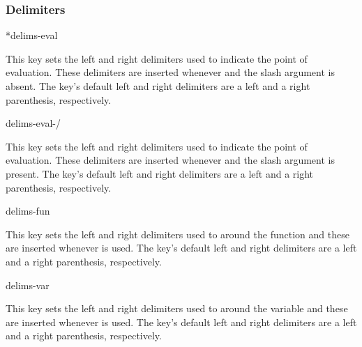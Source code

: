 \documentclass[final,british,10pt]{scrartcl}
\theoremstyle{remark}
\begin{document}
	\subsubsection*{Delimiters}
	
	\begin{option}*{delims-eval}
		\begin{values}[default = (~)]
		\end{values}
		This key sets the left and right delimiters used to indicate the point of evaluation. These delimiters are inserted whenever  and the slash argument is absent. The key's default left and right delimiters are a left and a right parenthesis, respectively.
	\end{option}
	
	\begin{option}{delims-eval-/}
		\begin{values}[default = (~)]
		\end{values}
		This key sets the left and right delimiters used to indicate the point of evaluation. These delimiters are inserted whenever  and the slash argument is present. The key's default left and right delimiters are a left and a right parenthesis, respectively.
	\end{option}
	
	\begin{option}{delims-fun}
		\begin{values}[default = (~)]
		\end{values}
		This key sets the left and right delimiters used to around the function and these are inserted whenever  is used. The key's default left and right delimiters are a left and a right parenthesis, respectively.
	\end{option}
	
	\begin{option}{delims-var}
		\begin{values}[default = (~)]
		\end{values}
		This key sets the left and right delimiters used to around the variable and these are inserted whenever  is used. The key's default left and right delimiters are a left and a right parenthesis, respectively.
	\end{option}
	
\end{document}
